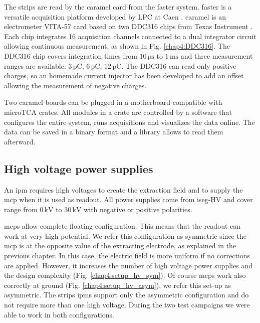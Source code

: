 \begin{refsection}
  The strips are read by the \acrshort{caramel} card \cite{caramel2013} from the \acrshort{faster} system. \acrshort{faster} is a versatile acquisition platform developed by LPC at Caen \cite{faster2013}. \acrshort{caramel} is an electrometer VITA-57 card based on two DDC316 chips from Texas Instrument \cite{ddc316}. Each chip integrates 16 acquisition channels connected to a dual integrator circuit allowing continuous measurement, as shown in Fig. \ref{chap4:DDC316}. The DDC316 chip covers integration times from $10\,\mathrm{\mu s}$ to $1\,\mathrm{ms}$ and three measurement ranges are available: $3\,\mathrm{pC}$, $6\,\mathrm{pC}$, $12\,\mathrm{pC}$. The DDC316 can read only positive charges, so an homemade current injector has been developed to add an offset allowing the measurement of negative charges.
  

  Two \acrshort{caramel} boards can be plugged in a motherboard compatible with microTCA crates. All modules in a crate are controlled by a software that configures the entire system, runs acquisitions and visualizes \cite{rhb2012} the data online. The data can be saved in a binary format and a library allows to read them afterward.

  \subsection{High voltage power supplies}
  An \acrshort{ipm} requires high voltages to create the extraction field and to supply the \acrshort{mcp} when it is used as readout. All power supplies come from iseg-HV \cite{iseg2019} and cover range from $0\,\mathrm{kV}$ to $30\,\mathrm{kV}$ with negative or positive polarities.

  \acrshort{mcp}s allow complete floating configuration. This means that the readout can work at very high potential. We refer this configuration as symmetric since the \acrshort{mcp} is at the opposite value of the extracting electrode, as explained in the previous chapter. In this case, the electric field is more uniform if no corrections are applied. However, it increases the number of high voltage power supplies and the design complexity (Fig. \ref{chap4:setup_hv_sym}).
  Of course \acrshort{mcp}s work also correctly at ground (Fig. \ref{chap4:setup_hv_asym}), we refer this set-up as asymmetric. The strips \acrshort{ipm}s support only the asymmetric configuration and do not require more than one high voltage. During the two test campaigns we were able to work in both configurations.


\end{refsection}
